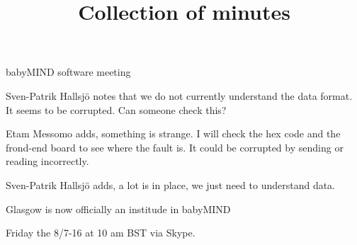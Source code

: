 \documentclass{article}
\title{Collection of minutes}
\author{\LaTeXe}
\begin{document}
\begin{Minutes}{babyMIND software meeting}

\maketitle

Sven-Patrik Hallsj\"o notes that we do not currently understand the data format. It seems to be corrupted. Can someone check this?

Etam Messomo adds, something is strange. I will check the hex code and the frond-end board to see where the fault is. It could be corrupted by sending or reading incorrectly.

Sven-Patrik Hallsj\"o adds, a lot is in place, we just need to understand data.

Glasgow is now officially an institude in babyMIND

Friday the 8/7-16 at 10 am BST via Skype.

\end{Minutes}
\end{document}
